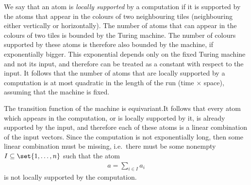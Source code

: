 We say that an atom is \emph{locally supported} by a computation if it is supported by the atoms that appear in the colours of two neighbouring tiles (neighbouring either vertically or horizontally). The number of atoms that can appear in the colours of two tiles is bounded by the Turing machine. The number of colours supported by these atoms is therefore also bounded by the machine, if exponentially bigger. This exponential depends only on the fixed Turing machine and not its input, and therefore can be treated as a constant with respect to the input. It follows that the number of atoms that are locally supported by a computation is at most quadratic in the length of the run (time $\times$ space), assuming that the machine is fixed.

The transition function of the machine is equivariant.It follows that every atom which appears in the computation, or is locally supported by it, is already supported by the input, and therefore each of these atoms is a linear combination of the input vectors. Since the computation is not exponentially long, then some linear combination must be missing, i.e.~there must be some nonempty $I \subseteq \set{1,\ldots,n}$ such that the atom
\begin{align*}
a = 		\sum_{i \in I} a_i
\end{align*}
is not locally supported by the computation. 


